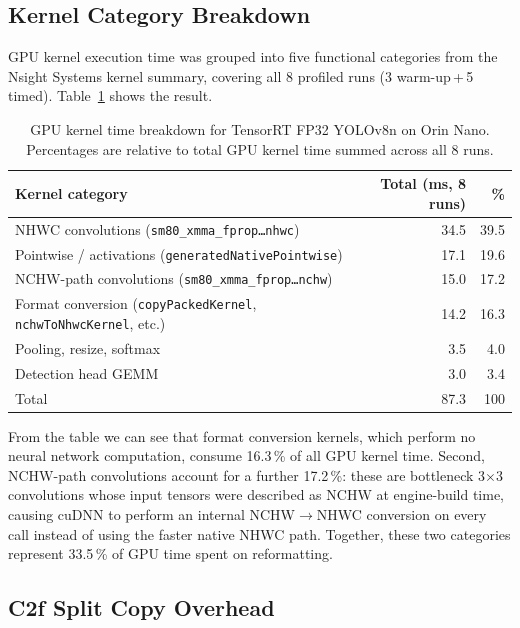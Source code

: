 \documentclass[12pt,a4paper]{report}
\begin{document}
\subsection{Kernel Category Breakdown}

GPU kernel execution time was grouped into five functional categories from the Nsight Systems kernel
summary, covering all 8 profiled runs (3 warm-up\,+\,5 timed).
Table~\ref{tab:kernel_categories} shows the result.

\begin{table}[h]
\centering
\caption{GPU kernel time breakdown for TensorRT FP32 YOLOv8n on Orin Nano.
Percentages are relative to total GPU kernel time summed across all 8 runs.}
\label{tab:kernel_categories}
\begin{tabular}{lrr}
\toprule
Kernel category & Total (ms, 8 runs) & \% \\
\midrule
NHWC convolutions (\texttt{sm80\_xmma\_fprop\ldots{}nhwc})      & 34.5 & 39.5 \\
Pointwise / activations (\texttt{generatedNativePointwise})      & 17.1 & 19.6 \\
NCHW-path convolutions (\texttt{sm80\_xmma\_fprop\ldots{}nchw}) & 15.0 & 17.2 \\
Format conversion (\texttt{copyPackedKernel}, \texttt{nchwToNhwcKernel}, etc.) & 14.2 & 16.3 \\
Pooling, resize, softmax                                          &  3.5 &  4.0 \\
Detection head GEMM                                               &  3.0 &  3.4 \\
\midrule
Total                                                             & 87.3 & 100  \\
\bottomrule
\end{tabular}
\end{table}

\noindent From the table we can see that format conversion kernels, which perform no neural network computation, consume
16.3\,\% of all GPU kernel time.
Second, NCHW-path convolutions account for a further 17.2\,\%: these are bottleneck 3$\times$3
convolutions whose input tensors were described as NCHW at engine-build time, causing cuDNN to perform
an internal NCHW$\rightarrow$NHWC conversion on every call instead of using the faster native NHWC
path.
Together, these two categories represent 33.5\,\% of GPU time spent on reformatting.

\subsection{C2f Split Copy Overhead}
\label{sec:split_copy_overhead}
\end{document}
